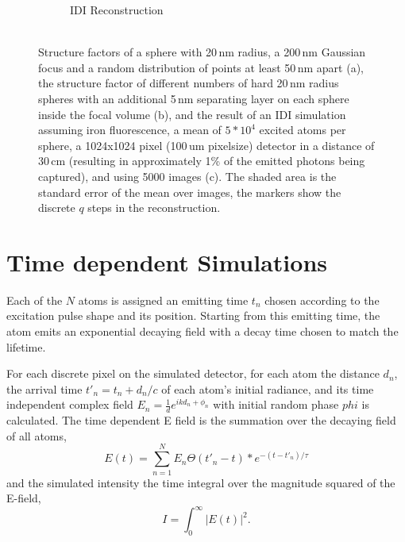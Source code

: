 \begin{figure}
\begin{subfigure}[b]{0.32\textwidth}
		\caption{IDI Reconstruction \\ $ $}
		\label{fig:multisphere2}
	\end{subfigure}
\caption{Structure factors of a sphere with 20\,nm radius, a 200\,nm Gaussian focus and a random distribution of points at least 50\,nm apart (a), the structure factor of different numbers of hard 20\,nm radius spheres with an additional 5\,nm separating layer on each sphere inside the focal volume (b), and the result of an IDI simulation assuming iron fluorescence, a mean of $5*10^4$ excited atoms per sphere, a 1024x1024 pixel (100\,um pixelsize) detector in a distance of 30\,cm (resulting in approximately 1\% of the emitted photons being captured), and using 5000 images (c). The shaded area is the standard error of the mean over images, the markers show the discrete $q$ steps in the reconstruction.}

\end{figure}

\section{Time dependent Simulations}

Each of the $N$ atoms is assigned an emitting time $t_{n}$ chosen according to the excitation pulse shape and its position. Starting from this emitting time, the atom emits an exponential decaying field with a decay time chosen to match the lifetime. 



For each discrete pixel on the simulated detector, for each atom the distance $d_n$, the arrival time $t'_n=t_n+d_n/c$ of each atom's initial radiance, and its time independent complex field $E_n=\frac{1}{d} e^{ikd_n+\phi_n}$ with initial random phase $phi$ is calculated.
The time dependent E field is the summation over the decaying field of all atoms,
\begin{equation}
E(t)=\sum_{n=1}^N  E_n \Theta(t'_n  - t) * e^{-(t-t'_n )/\tau}
\label{eq:tdsum}
\end{equation}
and the simulated intensity the time integral over the magnitude squared of the E-field,
\begin{equation}
I=\int_0^\infty \left| E(t) \right|^2 .
\label{eq:tdint}
\end{equation}

